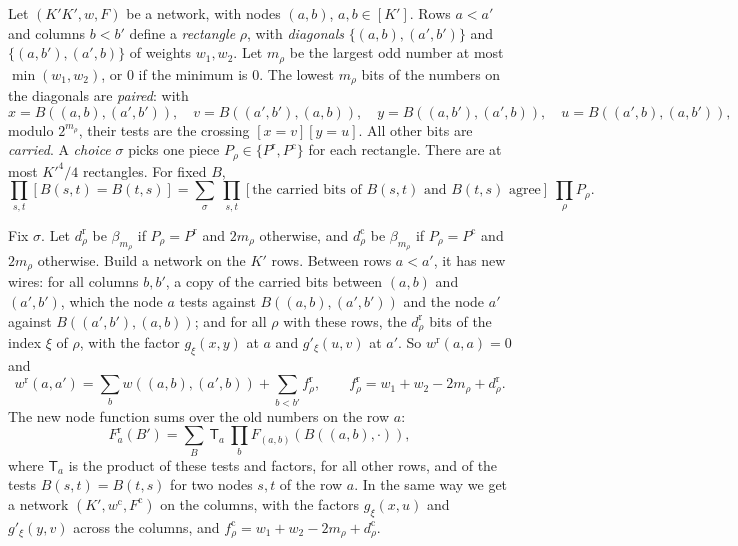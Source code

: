 \documentclass[10pt]{article}
\begin{document}
Let $(K'K',w,F)$ be a network, with nodes $(a,b)$, $a,b\in[K']$. Rows $a<a'$ and columns $b<b'$ define a \emph{rectangle} $\rho$, with \emph{diagonals} $\{(a,b),(a',b')\}$ and $\{(a,b'),(a',b)\}$ of weights $w_1,w_2$. Let $m_\rho$ be the largest odd number at most $\min(w_1,w_2)$, or $0$ if the minimum is $0$. The lowest $m_\rho$ bits of the numbers on the diagonals are \emph{paired}: with
\[
x=B((a,b),(a',b')),\quad v=B((a',b'),(a,b)),\quad y=B((a,b'),(a',b)),\quad u=B((a',b),(a,b')),
\]
modulo $2^{m_\rho}$, their tests are the crossing $[x=v][y=u]$. All other bits are \emph{carried}. A \emph{choice} $\sigma$ picks one piece $P_\rho\in\{P^{\mathrm r},P^{\mathrm c}\}$ for each rectangle. There are at most $K'^4/4$ rectangles. For fixed $B$,
\begin{equation}\label{expand}
\prod_{s,t}[B(s,t)=B(t,s)]=\sum_\sigma\ \prod_{s,t}[\text{the carried bits of $B(s,t)$ and $B(t,s)$ agree}]\ \prod_\rho P_\rho.
\end{equation}

Fix $\sigma$. Let $d^{\mathrm r}_\rho$ be $\beta_{m_\rho}$ if $P_\rho=P^{\mathrm r}$ and $2m_\rho$ otherwise, and $d^{\mathrm c}_\rho$ be $\beta_{m_\rho}$ if $P_\rho=P^{\mathrm c}$ and $2m_\rho$ otherwise. Build a network on the $K'$ rows. Between rows $a<a'$, it has new wires: for all columns $b,b'$, a copy of the carried bits between $(a,b)$ and $(a',b')$, which the node $a$ tests against $B((a,b),(a',b'))$ and the node $a'$ against $B((a',b'),(a,b))$; and for all $\rho$ with these rows, the $d^{\mathrm r}_\rho$ bits of the index $\xi$ of $\rho$, with the factor $g_\xi(x,y)$ at $a$ and $g'_\xi(u,v)$ at $a'$. So $w^{\mathrm r}(a,a)=0$ and
\begin{equation}\label{wrow}
w^{\mathrm r}(a,a')=\sum_bw((a,b),(a',b))+\sum_{b<b'}f^{\mathrm r}_\rho,\qquad f^{\mathrm r}_\rho=w_1+w_2-2m_\rho+d^{\mathrm r}_\rho.
\end{equation}
The new node function sums over the old numbers on the row $a$:
\begin{equation}\label{newF}
F^{\mathrm r}_a(B')=\sum_{B}\ \mathsf T_a\ \prod_{b}F_{(a,b)}(B((a,b),\cdot)),
\end{equation}
where $\mathsf T_a$ is the product of these tests and factors, for all other rows, and of the tests $B(s,t)=B(t,s)$ for two nodes $s,t$ of the row $a$. In the same way we get a network $(K',w^{\mathrm c},F^{\mathrm c})$ on the columns, with the factors $g_\xi(x,u)$ and $g'_\xi(y,v)$ across the columns, and $f^{\mathrm c}_\rho=w_1+w_2-2m_\rho+d^{\mathrm c}_\rho$.
\end{document}
